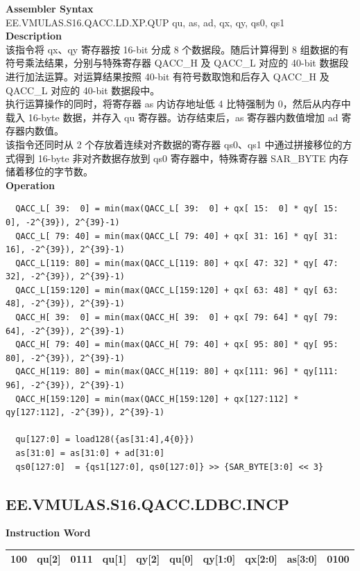 \textbf{Assembler Syntax} \\
EE.VMULAS.S16.QACC.LD.XP.QUP qu, as, ad, qx, qy, qs0, qs1 \\
\textbf{Description} \\
该指令将 qx、qy 寄存器按 16-bit 分成 8 个数据段。随后计算得到 8 组数据的有符号乘法结果，分别与特殊寄存器 QACC\_H 及 QACC\_L 对应的 40-bit 数据段进行加法运算。对运算结果按照 40-bit 有符号数取饱和后存入 QACC\_H 及 QACC\_L 对应的 40-bit 数据段中。\\
执行运算操作的同时，将寄存器 as 内访存地址低 4 比特强制为 0，然后从内存中载入 16-byte 数据，并存入 qu 寄存器。访存结束后，as 寄存器内数值增加 ad 寄存器内数值。\\
该指令还同时从 2 个存放着连续对齐数据的寄存器 qs0、qs1 中通过拼接移位的方式得到 16-byte 非对齐数据存放到 qs0 寄存器中，特殊寄存器 SAR\_BYTE 内存储着移位的字节数。\\
\textbf{Operation}
\begin{lstlisting}
  QACC_L[ 39:  0] = min(max(QACC_L[ 39:  0] + qx[ 15:  0] * qy[ 15:  0], -2^{39}), 2^{39}-1)
  QACC_L[ 79: 40] = min(max(QACC_L[ 79: 40] + qx[ 31: 16] * qy[ 31: 16], -2^{39}), 2^{39}-1)
  QACC_L[119: 80] = min(max(QACC_L[119: 80] + qx[ 47: 32] * qy[ 47: 32], -2^{39}), 2^{39}-1)
  QACC_L[159:120] = min(max(QACC_L[159:120] + qx[ 63: 48] * qy[ 63: 48], -2^{39}), 2^{39}-1)
  QACC_H[ 39:  0] = min(max(QACC_H[ 39:  0] + qx[ 79: 64] * qy[ 79: 64], -2^{39}), 2^{39}-1)
  QACC_H[ 79: 40] = min(max(QACC_H[ 79: 40] + qx[ 95: 80] * qy[ 95: 80], -2^{39}), 2^{39}-1)
  QACC_H[119: 80] = min(max(QACC_H[119: 80] + qx[111: 96] * qy[111: 96], -2^{39}), 2^{39}-1)
  QACC_H[159:120] = min(max(QACC_H[159:120] + qx[127:112] * qy[127:112], -2^{39}), 2^{39}-1)

  qu[127:0] = load128({as[31:4],4{0}})
  as[31:0] = as[31:0] + ad[31:0]
  qs0[127:0]  = {qs1[127:0], qs0[127:0]} >> {SAR_BYTE[3:0] << 3}
\end{lstlisting}

\clearpage
\subsection{EE.VMULAS.S16.QACC.LDBC.INCP}\label{instruction:EEVMULASS16QACCLDBCINCP}
\setlength\tabcolsep{6pt}
\textbf{Instruction Word} \\
\begin{tabular}{|c|c|c|c|c|c|c|c|c|c|}
	\hline
	100 & qu[2] & 0111 & qu[1] & qy[2] & qu[0] & qy[1:0] & qx[2:0] & as[3:0] & 0100 \\
	\hline
\end{tabular}

